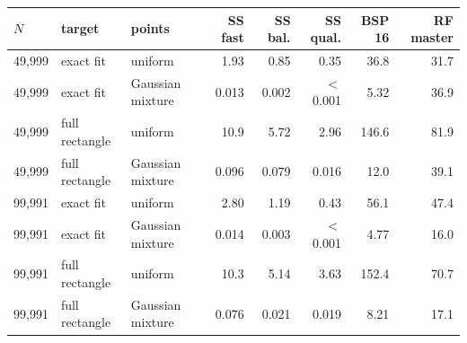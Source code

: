 \begin{tabular}{lllrrrrr}
\toprule
$N$ & target & points & SS fast & SS bal. & SS qual. & BSP 16 & RF master \\
\midrule
49,999 & exact fit & uniform & 1.93 & 0.85 & 0.35 & 36.8 & 31.7 \\
49,999 & exact fit & Gaussian mixture & 0.013 & 0.002 & $<$0.001 & 5.32 & 36.9 \\
49,999 & full rectangle & uniform & 10.9 & 5.72 & 2.96 & 146.6 & 81.9 \\
49,999 & full rectangle & Gaussian mixture & 0.096 & 0.079 & 0.016 & 12.0 & 39.1 \\
99,991 & exact fit & uniform & 2.80 & 1.19 & 0.43 & 56.1 & 47.4 \\
99,991 & exact fit & Gaussian mixture & 0.014 & 0.003 & $<$0.001 & 4.77 & 16.0 \\
99,991 & full rectangle & uniform & 10.3 & 5.14 & 3.63 & 152.4 & 70.7 \\
99,991 & full rectangle & Gaussian mixture & 0.076 & 0.021 & 0.019 & 8.21 & 17.1 \\
\bottomrule
\end{tabular}
